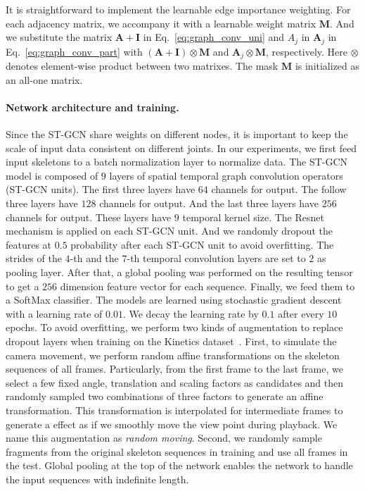\documentclass[letterpaper]{article} %
\begin{document}
It is straightforward to implement the learnable edge importance weighting.
For each adjacency matrix, we accompany it with a learnable weight matrix $ \mathbf{M} $.
And we substitute the matrix $ \mathbf{A} + \mathbf{I} $ in Eq.~\ref{eq:graph_conv_uni} and $ {A}_j $ in $ \mathbf{A}_j $ in Eq.~\ref{eq:graph_conv_part} with $(\mathbf{A} + \mathbf{I})\otimes\mathbf{M}$ and $ \mathbf{A}_j\otimes \mathbf{M} $, respectively.
Here $ \otimes $ denotes element-wise product between two matrixes.
The mask $ \mathbf{M} $ is initialized as an all-one matrix.

\paragraph{Network architecture and training.}
Since the ST-GCN share weights on different nodes, it is important to keep the scale of input data consistent on different joints.
In our experiments, we first feed input skeletons to a batch normalization layer to normalize data.
The ST-GCN model is composed of $9$ layers of spatial temporal graph convolution operators (ST-GCN units).
The first three layers have $ 64 $ channels for output.
The follow three layers have $128$ channels for output.
And the last three layers have $256$ channels for output.
These layers have $ 9 $ temporal kernel size.
The Resnet mechanism is applied on each ST-GCN unit.
And we randomly dropout the features at $0.5$ probability after each ST-GCN unit to avoid overfitting.
The strides of the $4$-th and the $7$-th temporal convolution layers are set to $2$ as
pooling layer.
After that, a global pooling was performed on the resulting tensor to get a $ 256 $ dimension feature vector for each sequence.
Finally, we feed them to a SoftMax classifier.
The models are learned using stochastic gradient descent with a learning rate of $ 0.01 $. We decay the learning rate by $ 0.1 $ after every $ 10 $ epochs.
To avoid overfitting, we perform two kinds of augmentation to replace dropout layers when training on the Kinetics dataset~\cite{Kay2017Kinetics}.
First, to simulate the camera movement, we perform random affine transformations on the skeleton sequences of all frames.
Particularly, from  the first frame to the last frame, we select a few fixed angle, translation and scaling factors as candidates
and then randomly
sampled two combinations of three factors to generate an affine transformation.
This transformation is interpolated for intermediate frames to generate a effect as if we smoothly move the view point during playback.
We name this augmentation as \emph{random moving}.
Second, we randomly sample fragments from the original skeleton sequences in training and use all frames in the test.
Global pooling at the top of the network enables the network to handle the input sequences with indefinite length.
\end{document}
